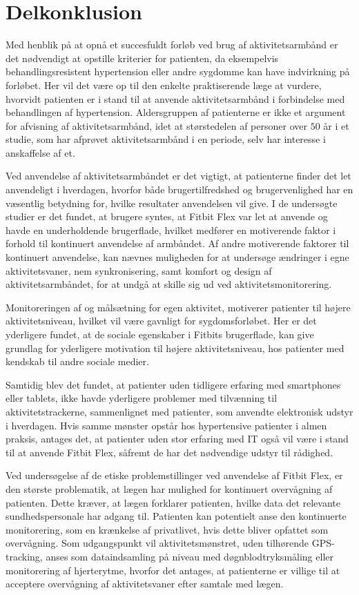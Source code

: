 \section{Delkonklusion}

Med henblik på at opnå et succesfuldt forløb ved brug af aktivitetsarmbånd er det nødvendigt at opstille kriterier for patienten, da eksempelvis behandlingsresistent hypertension eller andre sygdomme kan have indvirkning på forløbet. Her vil det være op til den enkelte praktiserende læge at vurdere, hvorvidt patienten er i stand til at anvende aktivitetsarmbånd i forbindelse med behandlingen af hypertension. Aldersgruppen af patienterne er ikke et argument for afvisning af aktivitetsarmbånd, idet at størstedelen af personer over $50$ år i et studie, som har afprøvet aktivitetsarmbånd i en periode, selv har interesse i anskaffelse af et.

Ved anvendelse af aktivitetsarmbåndet er det vigtigt, at patienterne finder det let anvendeligt i hverdagen, hvorfor både brugertilfredshed og brugervenlighed har en væsentlig betydning for, hvilke resultater anvendelsen vil give. I de undersøgte studier er det fundet, at brugere syntes, at Fitbit Flex var let at anvende og havde en underholdende brugerflade, hvilket medfører en motiverende faktor i forhold til kontinuert anvendelse af armbåndet. Af andre motiverende faktorer til kontinuert anvendelse, kan nævnes muligheden for at undersøge ændringer i egne aktivitetsvaner, nem synkronisering, samt komfort og design af aktivitetsarmbåndet, for at undgå at skille sig ud ved aktivitetsmonitorering.

Monitoreringen af og målsætning for egen aktivitet, motiverer patienter til højere aktivitetsniveau, hvilket vil være gavnligt for sygdomsforløbet. Her er det yderligere fundet, at de sociale egenskaber i Fitbits brugerflade, kan give grundlag for yderligere motivation til højere aktivitetsniveau, hos patienter med kendskab til andre sociale medier.

Samtidig blev det fundet, at patienter uden tidligere erfaring med smartphones eller tablets, ikke havde yderligere problemer med tilvænning til aktivitetstrackerne, sammenlignet med patienter, som anvendte elektronisk udstyr i hverdagen. Hvis samme mønster opstår hos hypertensive patienter i almen praksis, antages det, at patienter uden stor erfaring med IT også vil være i stand til at anvende Fitbit Flex, såfremt de har det nødvendige udstyr til rådighed. 

Ved undersøgelse af de etiske problemstillinger ved anvendelse af Fitbit Flex, er den største problematik, at lægen har mulighed for kontinuert overvågning af patienten. Dette kræver, at lægen forklarer patienten, hvilke data det relevante sundhedspersonale har adgang til. Patienten kan potentielt anse den kontinuerte monitorering, som en krænkelse af privatlivet, hvis dette bliver opfattet som overvågning. Som udgangspunkt vil aktivitetsmønstret, uden tilhørende GPS-tracking, anses som dataindsamling på niveau med døgnblodtryksmåling eller monitorering af hjerterytme, hvorfor det antages, at patienterne er villige til at acceptere overvågning af aktivitetsvaner efter samtale med lægen. 